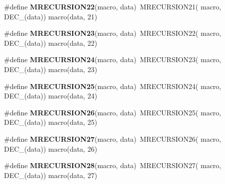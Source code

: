 \begin{DoxyCompactItemize}
\item 
\hypertarget{group__group__sam0__utils__mrecursion_gaae9d51e102fe3731e303a6142f0a61c7}{}\#define {\bfseries M\+R\+E\+C\+U\+R\+S\+I\+O\+N22}(macro,  data)~M\+R\+E\+C\+U\+R\+S\+I\+O\+N21(  macro, D\+E\+C\+\_\+(data))   macro(data, 21)\label{group__group__sam0__utils__mrecursion_gaae9d51e102fe3731e303a6142f0a61c7}

\item 
\hypertarget{group__group__sam0__utils__mrecursion_gad36f213730d138d54937ecd3944a6062}{}\#define {\bfseries M\+R\+E\+C\+U\+R\+S\+I\+O\+N23}(macro,  data)~M\+R\+E\+C\+U\+R\+S\+I\+O\+N22(  macro, D\+E\+C\+\_\+(data))   macro(data, 22)\label{group__group__sam0__utils__mrecursion_gad36f213730d138d54937ecd3944a6062}

\item 
\hypertarget{group__group__sam0__utils__mrecursion_ga18b9e365b9471938a0a0dbe70d1edfff}{}\#define {\bfseries M\+R\+E\+C\+U\+R\+S\+I\+O\+N24}(macro,  data)~M\+R\+E\+C\+U\+R\+S\+I\+O\+N23(  macro, D\+E\+C\+\_\+(data))   macro(data, 23)\label{group__group__sam0__utils__mrecursion_ga18b9e365b9471938a0a0dbe70d1edfff}

\item 
\hypertarget{group__group__sam0__utils__mrecursion_gab0af7dcb16c6cab77aee742dc6b7f14b}{}\#define {\bfseries M\+R\+E\+C\+U\+R\+S\+I\+O\+N25}(macro,  data)~M\+R\+E\+C\+U\+R\+S\+I\+O\+N24(  macro, D\+E\+C\+\_\+(data))   macro(data, 24)\label{group__group__sam0__utils__mrecursion_gab0af7dcb16c6cab77aee742dc6b7f14b}

\item 
\hypertarget{group__group__sam0__utils__mrecursion_ga1489cb59fe5eae201d1b3ef286a3a0bf}{}\#define {\bfseries M\+R\+E\+C\+U\+R\+S\+I\+O\+N26}(macro,  data)~M\+R\+E\+C\+U\+R\+S\+I\+O\+N25(  macro, D\+E\+C\+\_\+(data))   macro(data, 25)\label{group__group__sam0__utils__mrecursion_ga1489cb59fe5eae201d1b3ef286a3a0bf}

\item 
\hypertarget{group__group__sam0__utils__mrecursion_gac80453410a8ee5d6e0e0b0c2c3f287e2}{}\#define {\bfseries M\+R\+E\+C\+U\+R\+S\+I\+O\+N27}(macro,  data)~M\+R\+E\+C\+U\+R\+S\+I\+O\+N26(  macro, D\+E\+C\+\_\+(data))   macro(data, 26)\label{group__group__sam0__utils__mrecursion_gac80453410a8ee5d6e0e0b0c2c3f287e2}

\item 
\hypertarget{group__group__sam0__utils__mrecursion_ga57cf3ea94a7639a7e56ea4b2692eaca3}{}\#define {\bfseries M\+R\+E\+C\+U\+R\+S\+I\+O\+N28}(macro,  data)~M\+R\+E\+C\+U\+R\+S\+I\+O\+N27(  macro, D\+E\+C\+\_\+(data))   macro(data, 27)\label{group__group__sam0__utils__mrecursion_ga57cf3ea94a7639a7e56ea4b2692eaca3}


\end{DoxyCompactItemize}
